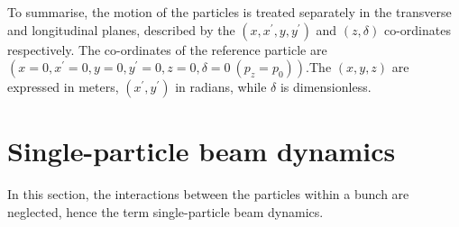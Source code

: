 

To summarise, the motion of the particles is treated separately in the transverse and longitudinal planes, described by the $(x, x^\prime, y, y^\prime)$ and $(z, \delta)$ co-ordinates respectively. The co-ordinates of the reference particle are $(x=0, x^\prime=0, y=0, y^\prime = 0, z=0, \delta=0 \ (p_z=p_0))$.The $(x, y, z)$ are expressed in meters, $(x^\prime, y^\prime)$ in radians, while $\delta$ is dimensionless.



\section{Single-particle beam dynamics}\label{sec:single_particle_dynamics}
In this section, the interactions between the particles within a bunch are neglected, hence the term single-particle beam dynamics. 



